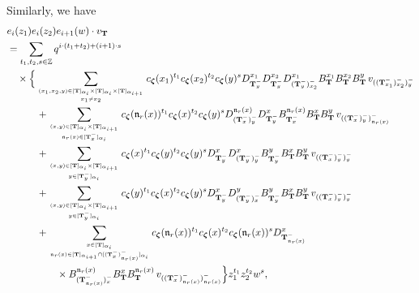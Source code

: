\documentclass[12pt]{amsart}
\numberwithin{equation}{thm}
\newcommand\ZZ{\mathbb Z}
\newcommand\bT{\mathbf T}
\newcommand\fn{\mathfrak n}
\renewcommand\a{\alpha}  %
\newcommand\Bz{\boldsymbol\zeta}
\begin{document}
Similarly, we have 
\begin{align}
\label{eiz1 eiz2 ei+1w vbT} 
&e_i(z_1) e_i(z_2) e_{i+1}(w) \cdot v_{\bT} 
\\
& \notag
= \sum_{t_1,t_2,s \in \ZZ} q^{i \cdot (t_1+t_2) + (i+1) \cdot s} 
	\\ & \notag \quad \times \Big\{ 
	\sum_{(x_1,x_2,y) \in [\bT]_{\a_i} \times [\bT]_{\a_i} \times [\bT]_{\a_{i+1}} \atop x_1 \not= x_2 } 
		c_{\Bz} (x_1)^{t_1} c_{\Bz} (x_2)^{t_2} c_{\Bz} (y)^s 
		D_{\bT_y^-}^{x_1} D_{\bT_y^-}^{x_2} D_{(\bT_y^-)_{x_2}^-}^{x_1} 
		B_{\bT}^{x_1} B_{\bT}^{x_2} B_{\bT}^y \, v_{((\bT_{x_1}^-)_{x_2}^-)_y^-} 
	\\ \notag & \hspace{3em} 
	+ \sum_{(x,y) \in [\bT]_{\a_i} \times [\bT]_{\a_{i+1}} \atop \fn_r (x) \in [\bT_x^-]_{\a_i}} 
		c_{\Bz} (\fn_r (x))^{t_1} c_{\Bz} (x)^{t_2} c_{\Bz} (y)^s 
		D_{(\bT_x^-)_y^-}^{\fn_r(x)} D_{\bT_y^-}^x 
		B_{\bT_x^-}^{\fn_r(x)} B_{\bT}^x B_{\bT}^y \, v_{((\bT_x^-)_y^-)_{\fn_r(x)}^-} 
	\\  \notag & \hspace{3em} 
	+ \sum_{(x,y) \in [\bT]_{\a_i} \times [\bT]_{\a_{i+1}} \atop y \in [\bT_y^-]_{\a_i}} 
		c_{\Bz} (x)^{t_1} c_{\Bz} (y)^{t_2} c_{\Bz} (y)^s 
		D_{\bT_y^-}^x D_{(\bT_y^-)_y^-}^x 
		B_{\bT_y^-}^y B_{\bT}^x B_{\bT}^y \, v_{((\bT_x^-)_y^-)_y^-} 
	\\  \notag & \hspace{3em} 
	+ \sum_{(x,y) \in [\bT]_{\a_i} \times [\bT]_{\a_{i+1}} \atop y \in [\bT_y^-]_{\a_i}} 
		c_{\Bz} (y)^{t_1} c_{\Bz} (x)^{t_2} c_{\Bz} (y)^s 
		D_{\bT_y^-}^x D_{(\bT_y^-)_x^-}^y 
		B_{\bT_y^-}^y B_{\bT}^x B_{\bT}^y \, v_{((\bT_x^-)_y^-)_y^-} 
	\\ \notag & \hspace{3em} 
	+ \sum_{x \in [\bT]_{\a_i} \atop \fn_r(x) \in [\bT]_{\a_{i+1}} \cap [(\bT_x^-)_{\fn_r(x)}^-]_{\a_i}} 
		c_{\Bz}(\fn_r(x))^{t_1} c_{\Bz} (x)^{t_2} c_{\Bz} (\fn_r(x))^s 
		D_{\bT_{\fn_r(x)}^-}^x 
		\\ \notag & \hspace{5em} \times 
		B_{(\bT_{\fn_r(x)}^-)_x^-}^{\fn_r(x)} B_{\bT}^x B_{\bT}^{\fn_r(x)} \, v_{((\bT_x^-)_{\fn_r(x)}^-)_{\fn_r(x)}^-}  
	\Big\} z_1^{t_1} z_2^{t_2} w^s, 
\end{align}
\end{document}
